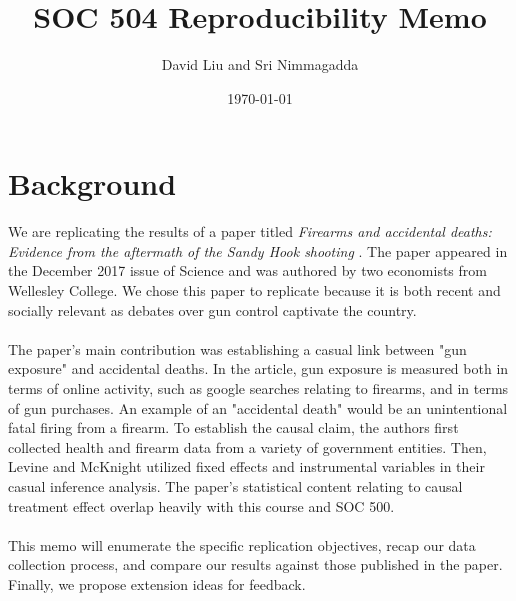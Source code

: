 \documentclass[12pt]{article}%
\begin{document}
\title{SOC 504 Reproducibility Memo} %
\author{David Liu and Sri Nimmagadda} %
\date{\today}
\maketitle 
\section*{Background}
We are replicating the results of a paper titled \textit{Firearms and accidental deaths: Evidence from the aftermath of the Sandy Hook shooting} \cite{Levine1324}. The paper appeared in the December 2017 issue of Science and was authored by two economists from Wellesley College. We chose this paper to replicate because it is both recent and socially relevant as debates over gun control captivate the country. \\ \\
The paper's main contribution was establishing a casual link between "gun exposure" and accidental deaths. In the article, gun exposure is measured both in terms of online activity, such as google searches relating to firearms, and in terms of gun purchases. An example of an "accidental death" would be an unintentional fatal firing from a firearm. To establish the causal claim, the authors first collected health and firearm data from a variety of government entities. Then, Levine and McKnight utilized fixed effects and instrumental variables in their casual inference analysis. The paper's statistical content relating to causal treatment effect overlap heavily with this course and SOC 500. \\ \\
This memo will enumerate the specific replication objectives, recap our data collection process, and compare our results against those published in the paper. Finally, we propose extension ideas for feedback. 
\end{document}
